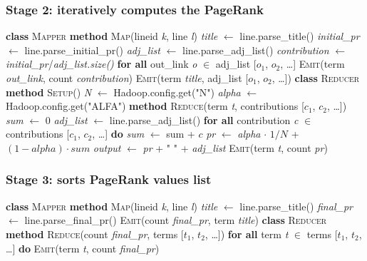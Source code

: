 \documentclass[11pt,a4paper]{article}
\begin{document}
\subsubsection*{Stage 2: iteratively computes the PageRank}
\begin{algorithm}[H]
\textbf{class} \textsc{Mapper}\;
\Indp\textbf{method} \textsc{Map}(lineid \textit{k}, line \textit{l})\;
\Indp\textit{title} $\leftarrow$ line.parse\_title()\;
\textit{initial\_pr} $\leftarrow$ line.parse\_initial\_pr()\;
\textit{adj\_list} $\leftarrow$ line.parse\_adj\_list()\;
\textit{contribution} $\leftarrow$ \textit{initial\_pr}/\textit{adj\_list.size()}\;
\textbf{for all} out\_link \textit{o} $\in$ adj\_list [$o_1$, $o_2$, \dots]\;
\Indp\textsc{Emit}(term \textit{out\_link}, count \textit{contribution})\;
\Indm\textsc{Emit}(term \textit{title}, adj\_list [$o_1$, $o_2$, \dots])\;
\;
\Indm\textbf{class} \textsc{Reducer}\;
\Indp\textbf{method} \textsc{Setup}()\;
\Indp\textit{N} $\leftarrow$ Hadoop.config.get("N")\;
\textit{alpha} $\leftarrow$ Hadoop.config.get("ALFA")\;
\;
\Indm\textbf{method} \textsc{Reduce}(term \textit{t}, contributions [$c_1$, $c_2$, \dots])\;
\Indp\textit{sum} $\leftarrow$ $0$\;
\textit{adj\_list} $\leftarrow$ line.parse\_adj\_list()\;
\textbf{for all} contribution \textit{c} $\in$ contributions [$c_1$, $c_2$, \dots] \textbf{do}\;
\Indp\textit{sum} $\leftarrow$ sum + $c$\;
\Indm\textit{pr} $\leftarrow$ \textit{alpha} $\cdot$ $1/N$ + $\left(1 - alpha\right) \cdot sum$\;
\textit{output} $\leftarrow$ \textit{pr} + " " + \textit{adj\_list}\;
\textsc{Emit}(term \textit{t}, count \textit{pr})
\end{algorithm}
\subsubsection*{Stage 3: sorts PageRank values list}
\begin{algorithm}[H]
\textbf{class} \textsc{Mapper}\;
\Indp\textbf{method} \textsc{Map}(lineid \textit{k}, line \textit{l})\;
\Indp\textit{title} $\leftarrow$ line.parse\_title()\;
\textit{final\_pr} $\leftarrow$ line.parse\_final\_pr()\;
\textsc{Emit}(count \textit{final\_pr}, term \textit{title})\;
\;
\Indm\textbf{class} \textsc{Reducer}\;
\Indp\textbf{method} \textsc{Reduce}(count \textit{final\_pr}, terms [$t_1$, $t_2$, \dots])\;
\textbf{for all} term \textit{t} $\in$ terms [$t_1$, $t_2$, \dots] \textbf{do}\;
\Indp\textsc{Emit}(term \textit{t}, count \textit{final\_pr})
\end{algorithm}
\end{document}

